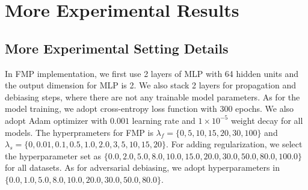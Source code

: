 \documentclass[letterpaper]{article} %
\theoremstyle{plain}
\theoremstyle{definition}
\theoremstyle{remark}
\begin{document}


\section{More Experimental Results}\label{app:more_exp}

\subsection{More Experimental Setting Details}\label{app:exp_detail}
In FMP implementation, we first use 2 layers of MLP with 64 hidden units and the output dimension for MLP is 2. We also stack 2 layers for propagation and debiasing steps, where there are not any trainable model parameters. As for the model training, we adopt cross-entropy loss function with 300 epochs. We also adopt Adam optimizer with $0.001$ learning rate and $1\times 10^{-5}$
weight decay for all models. The hyperprameters for FMP is $\lambda_{f}=\{0, 5, 10, 15, 20, 30, 100\}$ and $\lambda_{s}=\{0, 0.01, 0.1, 0.5, 1.0, 2.0, 3, 5, 10, 15, 20\}$. For adding regularization, we select the hyperparameter set as $\{0.0, 2.0, 5.0, 8.0, 10.0, 15.0, 20.0, 30.0, 50.0, 80.0, 100.0\}$ for all datasets. As for adversarial debiasing, we adopt hyperparameters in $\{0.0, 1.0, 5.0, 8.0, 10.0, 20.0, 30.0, 50.0, 80.0\}$.
\end{document}
